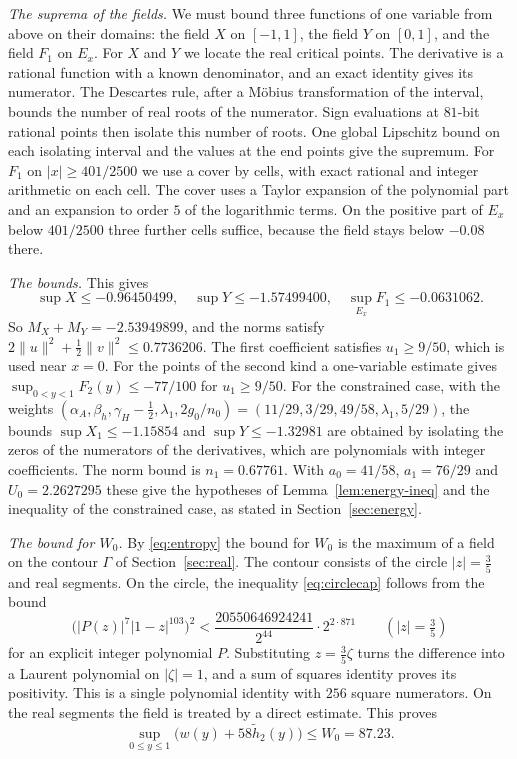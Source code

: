 \documentclass[11pt]{amsart}
\newcommand{\WZero}{87.23}
\newcommand{\Uzero}{2.2627295}
\newcommand{\SupX}{-0.96450499}
\newcommand{\SupY}{-1.57499400}
\newcommand{\FieldCap}{-2.53949899}
\newcommand{\ResCap}{-0.0631062}
\theoremstyle{definition}
\theoremstyle{remark}
\numberwithin{equation}{section}
\begin{document}
\emph{The suprema of the fields.} We must bound three functions of one variable from above on their domains: the
field $X$ on $[-1,1]$, the field $Y$ on $[0,1]$, and the field $F_1$ on $E_x$. For $X$ and $Y$ we locate the real
critical points. The derivative is a rational function with a known denominator, and an exact identity gives its
numerator. The Descartes rule, after a M\"obius transformation of the interval, bounds the number of real roots
of the numerator. Sign evaluations at $81$-bit rational points then isolate this number of roots. One global Lipschitz
bound on each isolating interval and the values at the end points give the supremum. For $F_1$ on $|x|\ge401/2500$ we use a
cover by cells, with exact rational and integer arithmetic on each cell. The cover uses a Taylor expansion of the
polynomial part and an expansion to order $5$ of the logarithmic terms. On the positive part of $E_x$ below $401/2500$
three further cells suffice, because the field stays below $-0.08$ there.

\emph{The bounds.} This gives
\[
 \sup X\le\SupX,\quad \sup Y\le\SupY,\quad \sup_{E_x}F_1\le\ResCap .
\]
So $M_X+M_Y=\FieldCap$, and the norms satisfy $2\|u\|^2+\frac12\|v\|^2\le0.7736206$. The first coefficient satisfies
$u_1\ge9/50$, which is used near $x=0$. For the points of the second kind a one-variable estimate gives
$\sup_{0<y<1}F_2(y)\le-77/100$ for $u_1\ge9/50$. For the constrained case, with the weights
$(\alpha_A,\beta_h,\gamma_H-\frac12,\lambda_1,2g_0/n_0)=(11/29,3/29,49/58,\lambda_1,5/29)$, the bounds
$\sup X_1\le-1.15854$ and $\sup Y\le-1.32981$ are obtained by isolating the zeros of the numerators of the
derivatives, which are polynomials with integer coefficients. The norm bound is $n_1=0.67761$. With $a_0=41/58$,
$a_1=76/29$ and $U_0=\Uzero$ these give the hypotheses of Lemma~\ref{lem:energy-ineq} and the inequality of the
constrained case, as stated in Section~\ref{sec:energy}.

\emph{The bound for $W_0$.} By \eqref{eq:entropy} the bound for $W_0$ is the maximum of a field on the contour $\Gamma$ of
Section~\ref{sec:real}. The contour consists of the circle $|z|=\frac35$ and real segments. On the circle, the
inequality \eqref{eq:circlecap} follows from the bound
\[
 \bigl(|P(z)|^7|1-z|^{103}\bigr)^2<\frac{20550646924241}{2^{44}}\cdot2^{2\cdot871}\qquad(|z|=\tfrac35)
\]
for an explicit integer polynomial $P$. Substituting $z=\frac35\zeta$ turns the difference into a Laurent polynomial on
$|\zeta|=1$, and a sum of squares identity proves its positivity. This is a single polynomial identity with $256$ square
numerators. On the real segments the field is treated by a direct estimate. This proves
\[
 \sup_{0\le y\le1}\bigl(w(y)+58\tilde h_2(y)\bigr)\le W_0=\WZero .
\]
\end{document}
